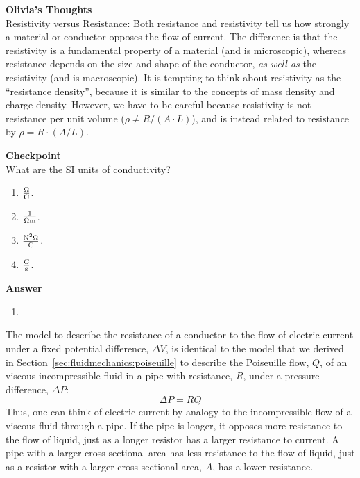 \begin{framed}
\textbf{Olivia's Thoughts}\\
Resistivity versus Resistance: Both resistance and resistivity tell us how strongly a material or conductor opposes the flow of current. The difference is that the resistivity is a fundamental property of a material (and is microscopic), whereas resistance depends on the size and shape of the conductor, \textit{as well as} the resistivity (and is macroscopic). It is tempting to think about resistivity as the ``resistance density'', because it is similar to the concepts of mass density and charge density. However, we have to be careful because resistivity is not resistance per unit volume ($\rho \neq R/(A\cdot L)$), and is instead related to resistance by $\rho=R\cdot (A/L)$.
\end{framed}

\begin{framed}
\textbf{Checkpoint}\\
What are the SI units of conductivity?

\begin{enumerate}
\item ${\rm \frac{\Omega}{C}}$.
\item ${\rm \frac{1}{\Omega m}}$.
\item ${\rm \frac{N^2 \Omega}{C}}$.
\item ${\rm \frac{C}{s}}$.
\end{enumerate}

\begin{framed}
\textbf{Answer}\\
\begin{enumerate}[resume]
\item
\end{enumerate}
\end{framed}
\end{framed}

The model to describe the resistance of a conductor to the flow of electric current under a fixed potential difference, $\Delta V$, is identical to the model that we derived in Section~\ref{sec:fluidmechanics:poiseuille} to describe the Poiseuille flow, $Q$, of an viscous incompressible fluid in a pipe with resistance, $R$, under a pressure difference, $\Delta P$:
\begin{equation}
\Delta P = RQ
\end{equation}
Thus, one can think of electric current by analogy to the incompressible flow of a viscous fluid through a pipe. If the pipe is longer, it opposes more resistance to the flow of liquid, just as a longer resistor has a larger resistance to current. A pipe with a larger cross-sectional area has less resistance to the flow of liquid, just as a resistor with a larger cross sectional area, $A$, has a lower resistance.

